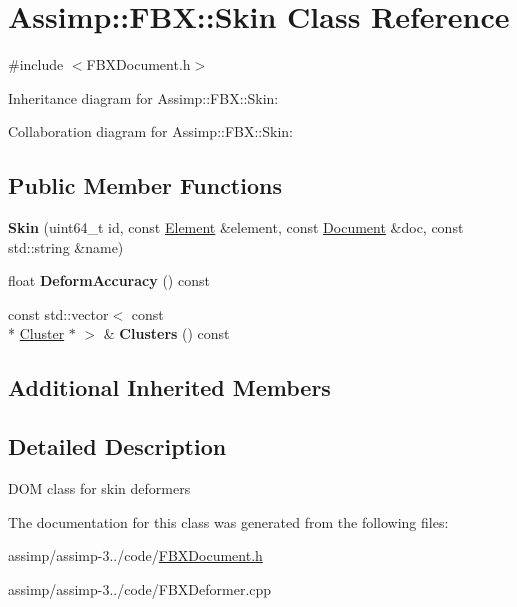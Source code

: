 \hypertarget{class_assimp_1_1_f_b_x_1_1_skin}{\section{Assimp\+:\+:F\+B\+X\+:\+:Skin Class Reference}
\label{class_assimp_1_1_f_b_x_1_1_skin}
}


{\ttfamily \#include $<$F\+B\+X\+Document.\+h$>$}



Inheritance diagram for Assimp\+:\+:F\+B\+X\+:\+:Skin\+:


Collaboration diagram for Assimp\+:\+:F\+B\+X\+:\+:Skin\+:
\subsection*{Public Member Functions}
\begin{DoxyCompactItemize}
\item 
\hypertarget{class_assimp_1_1_f_b_x_1_1_skin_a461d51fbcb37b7daf1122aaf77e07904}{{\bfseries Skin} (uint64\+\_\+t id, const \hyperlink{class_assimp_1_1_f_b_x_1_1_element}{Element} \&element, const \hyperlink{class_assimp_1_1_f_b_x_1_1_document}{Document} \&doc, const std\+::string \&name)}\label{class_assimp_1_1_f_b_x_1_1_skin_a461d51fbcb37b7daf1122aaf77e07904}

\item 
\hypertarget{class_assimp_1_1_f_b_x_1_1_skin_a582044f254892f8825e59508750ede6c}{float {\bfseries Deform\+Accuracy} () const }\label{class_assimp_1_1_f_b_x_1_1_skin_a582044f254892f8825e59508750ede6c}

\item 
\hypertarget{class_assimp_1_1_f_b_x_1_1_skin_a98a6b09234dcb69a652cb6177f65b6cb}{const std\+::vector$<$ const \\*
\hyperlink{class_assimp_1_1_f_b_x_1_1_cluster}{Cluster} $\ast$ $>$ \& {\bfseries Clusters} () const }\label{class_assimp_1_1_f_b_x_1_1_skin_a98a6b09234dcb69a652cb6177f65b6cb}

\end{DoxyCompactItemize}
\subsection*{Additional Inherited Members}


\subsection{Detailed Description}
D\+O\+M class for skin deformers 

The documentation for this class was generated from the following files\+:\begin{DoxyCompactItemize}
\item 
assimp/assimp-\/3../code/\hyperlink{_f_b_x_document_8h}{F\+B\+X\+Document.\+h}\item 
assimp/assimp-\/3../code/F\+B\+X\+Deformer.\+cpp\end{DoxyCompactItemize}
